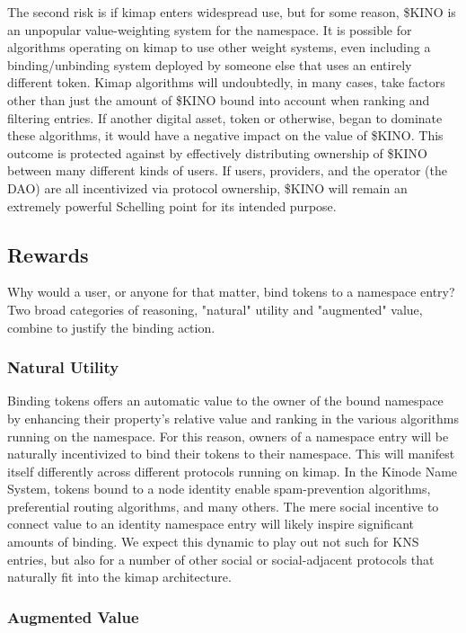 \documentclass[runningheads]{llncs}
\begin{document}
The second risk is if kimap enters widespread use, but for some reason, \$KINO is an unpopular value-weighting system for the namespace.
It is possible for algorithms operating on kimap to use other weight systems, even including a binding/unbinding system deployed by someone else that uses an entirely different token.
Kimap algorithms will undoubtedly, in many cases, take factors other than just the amount of \$KINO bound into account when ranking and filtering entries.
If another digital asset, token or otherwise, began to dominate these algorithms, it would have a negative impact on the value of \$KINO.
This outcome is protected against by effectively distributing ownership of \$KINO between many different kinds of users.
If users, providers, and the operator (the DAO) are all incentivized via protocol ownership, \$KINO will remain an extremely powerful Schelling point for its intended purpose.

\subsection{Rewards}

Why would a user, or anyone for that matter, bind tokens to a namespace entry?
Two broad categories of reasoning, "natural" utility and "augmented" value, combine to justify the binding action.

\subsubsection{Natural Utility}

Binding tokens offers an automatic value to the owner of the bound namespace by enhancing their property's relative value and ranking in the various algorithms running on the namespace.
For this reason, owners of a namespace entry will be naturally incentivized to bind their tokens to their namespace.
This will manifest itself differently across different protocols running on kimap.
In the Kinode Name System, tokens bound to a node identity enable spam-prevention algorithms, preferential routing algorithms, and many others.
The mere social incentive to connect value to an identity namespace entry will likely inspire significant amounts of binding.
We expect this dynamic to play out not such for KNS entries, but also for a number of other social or social-adjacent protocols that naturally fit into the kimap architecture.

\subsubsection{Augmented Value}
\end{document}

